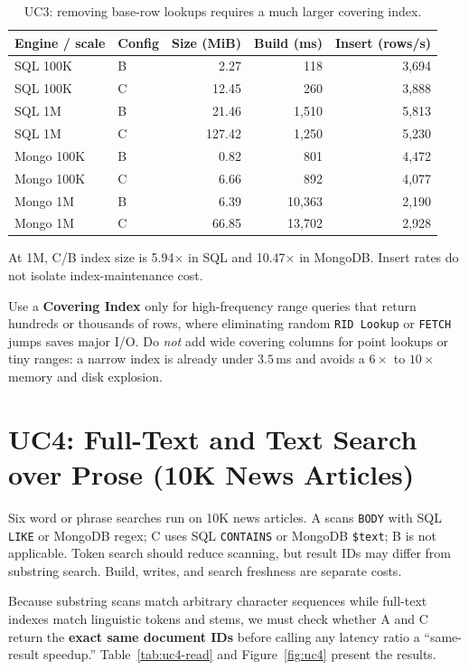 \begin{table}[H]
\centering\small
\caption{UC3: removing base-row lookups requires a much larger covering index.}
\label{tab:uc3-tradeoff}
\begin{tabular}{@{}l l r r r@{}}
\toprule
Engine / scale & Config & Size (MiB) & Build (ms) & Insert (rows/s)\\
\midrule
SQL 100K & B & 2.27 & 118 & 3,694\\
SQL 100K & C & 12.45 & 260 & 3,888\\
SQL 1M & B & 21.46 & 1,510 & 5,813\\
SQL 1M & C & 127.42 & 1,250 & 5,230\\
\midrule
Mongo 100K & B & 0.82 & 801 & 4,472\\
Mongo 100K & C & 6.66 & 892 & 4,077\\
Mongo 1M & B & 6.39 & 10,363 & 2,190\\
Mongo 1M & C & 66.85 & 13,702 & 2,928\\
\bottomrule
\end{tabular}
\par\smallskip\scriptsize\raggedright At 1M, C/B index size is 5.94$\times$ in SQL and 10.47$\times$ in MongoDB. Insert rates do not isolate index-maintenance cost.\par
\end{table}

Use a \textbf{Covering Index} only for high-frequency range queries that return hundreds or thousands of rows, where eliminating random \texttt{RID Lookup} or \texttt{FETCH} jumps saves major I/O. Do \emph{not} add wide covering columns for point lookups or tiny ranges: a narrow index is already under $3.5$\,ms and avoids a $6\times$ to $10\times$ memory and disk explosion.

\FloatBarrier
\section{UC4: Full-Text and Text Search over Prose (10K News Articles)}

Six word or phrase searches run on 10K news articles. A scans \texttt{BODY} with SQL \texttt{LIKE} or MongoDB regex; C uses SQL \texttt{CONTAINS} or MongoDB \texttt{\$text}; B is not applicable. Token search should reduce scanning, but result IDs may differ from substring search. Build, writes, and search freshness are separate costs.

Because substring scans match arbitrary character sequences while full-text indexes match linguistic tokens and stems, we must check whether A and C return the \textbf{exact same document IDs} before calling any latency ratio a ``same-result speedup.'' Table~\ref{tab:uc4-read} and Figure~\ref{fig:uc4} present the results.

